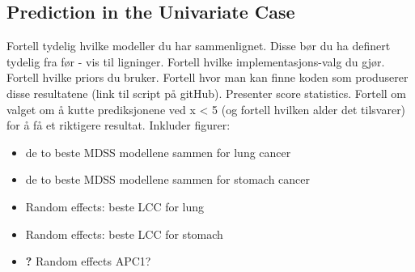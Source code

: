 \subsection{Prediction in the Univariate Case}
\textcolor{myDarkGreen}{
Fortell tydelig hvilke modeller du har sammenlignet. Disse bør du ha definert tydelig fra før - vis til ligninger. Fortell hvilke implementasjons-valg du gjør. Fortell hvilke priors du bruker. Fortell hvor man kan finne koden som produserer disse resultatene (link til script på gitHub). 
\newline \newline
Presenter score statistics. Fortell om valget om å kutte prediksjonene ved x < 5 (og fortell hvilken alder det tilsvarer) for å få et riktigere resultat.
\newline \newline
Inkluder figurer:
\begin{itemize}
    \item de to beste MDSS modellene sammen for lung cancer
    \item de to beste MDSS modellene sammen for stomach cancer
    \item Random effects: beste LCC for lung
    \item Random effects: beste LCC for stomach
    \item \textbf{?} Random effects APC1?
\end{itemize}
}

